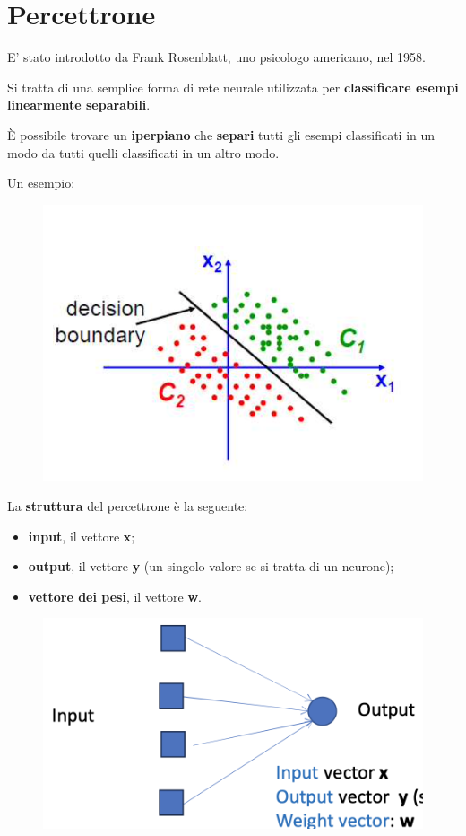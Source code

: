 \chapter{Percettrone}
E' stato introdotto da Frank Rosenblatt, uno psicologo americano, nel 1958.



Si tratta di una semplice forma di rete neurale utilizzata per \textbf{classificare esempi linearmente separabili}.



È possibile trovare un \textbf{iperpiano} che \textbf{separi} tutti gli esempi classificati in un modo da tutti quelli classificati in un altro modo.


Un esempio:
\begin{figure}[!h]
    \includegraphics[scale=.5]{images/perceptron/perceptron.png}
    \centering
\end{figure}



La \textbf{struttura} del percettrone è la seguente:
\begin{itemize}
    \item \textbf{input}, il vettore \textbf{x};
    \item \textbf{output}, il vettore \textbf{y} (un singolo valore se si tratta di un neurone);
    \item \textbf{vettore dei pesi}, il vettore \textbf{w}.
\end{itemize}
\begin{figure}[!h]
    \includegraphics[scale=.5]{images/perceptron/struct.png}
    \centering
\end{figure}

